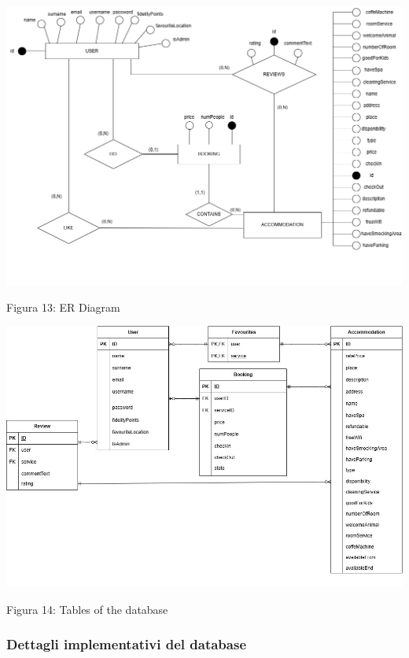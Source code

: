 \documentclass[10pt]{article}
\begin{document}
\begin{center}
\par\medskip
\hspace*{-2cm}
\includegraphics[scale=0.41]{ERimages/FinalER}
\par\medskip
Figura 13: ER Diagram
\par\medskip
\includegraphics[scale=0.5]{ERimages/schemaLogicoDBTabelle}
\par\medskip
Figura 14: Tables of the database
\par\medskip
\end{center}

\subsubsection{Dettagli implementativi del database}
\end{document}
